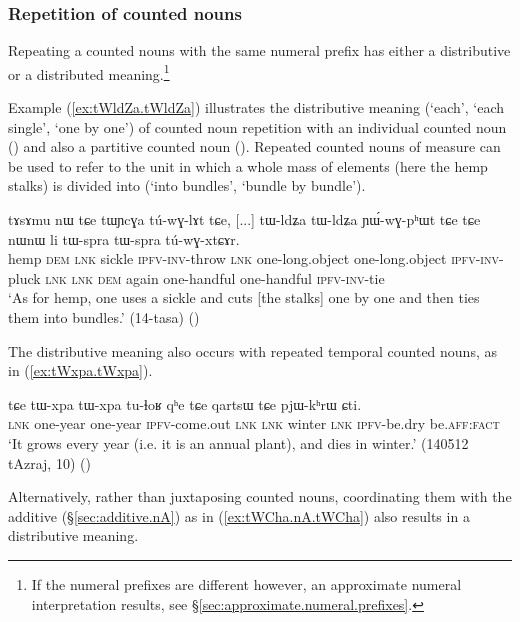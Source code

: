 \subsubsection{Repetition of counted nouns} \label{sec:CN.repetition}
Repeating a counted nouns with the same numeral prefix has either a distributive or a distributed meaning.\footnote{If the numeral prefixes are different however, an approximate numeral interpretation results, see §\ref{sec:approximate.numeral.prefixes}.}

Example (\ref{ex:tWldZa.tWldZa}) illustrates the distributive meaning (`each', `each single', `one by one') of counted noun repetition with an individual counted noun () and also a partitive counted noun  (). Repeated counted nouns of measure can be used to refer to the unit in which a whole mass of elements (here the hemp stalks) is divided into (`into bundles', `bundle by bundle').

\begin{exe}
	\ex \label{ex:tWldZa.tWldZa}
	\gll  tɤsɤmu nɯ tɕe tɯɲcɣa tú-wɣ-lɤt tɕe, [...] tɯ-ldʑa tɯ-ldʑa ɲɯ́-wɣ-pʰɯt tɕe tɕe nɯnɯ li tɯ-spra tɯ-spra tú-wɣ-xtɕɤr. \\
	hemp \textsc{dem} \textsc{lnk} sickle \textsc{ipfv}-\textsc{inv}-throw \textsc{lnk} { } one-long.object one-long.object \textsc{ipfv}-\textsc{inv}-pluck \textsc{lnk} \textsc{lnk} \textsc{dem} again one-handful one-handful \textsc{ipfv}-\textsc{inv}-tie  \\
	\glt `As for hemp, one uses a sickle and cuts [the stalks] one by one and then ties them into bundles.'  (14-tasa)
()
\end{exe}

The distributive meaning also occurs with repeated temporal counted nouns, as in (\ref{ex:tWxpa.tWxpa}).

\begin{exe}
	\ex \label{ex:tWxpa.tWxpa}
	\gll tɕe tɯ-xpa tɯ-xpa tu-ɬoʁ qʰe tɕe qartsɯ tɕe pjɯ-kʰrɯ ɕti. \\
	\textsc{lnk} one-year one-year \textsc{ipfv}-come.out \textsc{lnk} \textsc{lnk} winter \textsc{lnk}  \textsc{ipfv}-be.dry be.\textsc{aff}:\textsc{fact} \\
	\glt  `It grows every year (i.e. it is an annual plant), and dies in winter.' (140512 tAzraj, 10)
()
\end{exe}

Alternatively, rather than juxtaposing counted nouns, coordinating them with the additive  (§\ref{sec:additive.nA}) as in (\ref{ex:tWCha.nA.tWCha}) also results in a distributive meaning.

